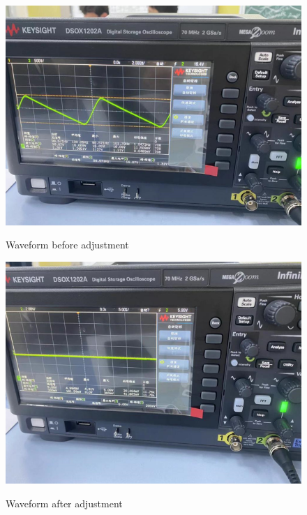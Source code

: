 \documentclass[UTF8]{article}
\begin{document}
   \begin{figure}[H]
          \begin{minipage}[t]{0.5\linewidth}
             \centering
             \includegraphics[clip,scale=0.5,trim={0 0 0 0}]{fig/fig21.png}
             \label{figure.11}
             \caption{Waveform before adjustment}
          \end{minipage}
          \begin{minipage}[t]{0.5\linewidth}
             \centering
             \includegraphics[clip,scale=0.5,trim={0 0 10 0}]{fig/fig22.png}
             \label{figure.12}
             \caption{Waveform after adjustment}
          \end{minipage}   	  
       \end{figure}  
   
\end{document}
